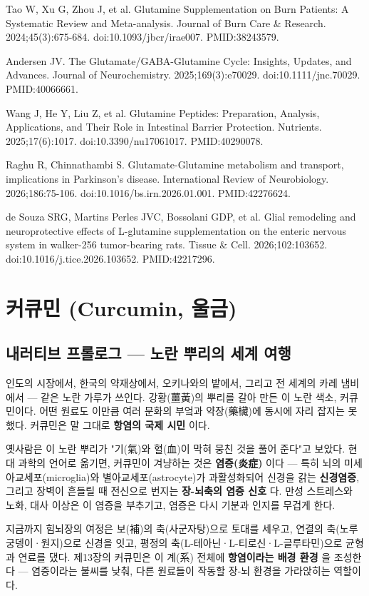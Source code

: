 \documentclass[11pt,oneside]{book}
\newcommand{\refend}{\endgroup\par}
\newcommand{\reff}[2]{\par\hangindent=7mm\hangafter=1\noindent[#1]\hspace{2mm}#2\par}
\begin{document}
\reff{34}{Tao W, Xu G, Zhou J, et al. Glutamine Supplementation on Burn Patients: A Systematic Review and Meta-analysis. Journal of Burn Care \& Research. 2024;45(3):675-684. doi:10.1093/jbcr/irae007. PMID:38243579.}
\reff{35}{Andersen JV. The Glutamate/GABA-Glutamine Cycle: Insights, Updates, and Advances. Journal of Neurochemistry. 2025;169(3):e70029. doi:10.1111/jnc.70029. PMID:40066661.}
\reff{36}{Wang J, He Y, Liu Z, et al. Glutamine Peptides: Preparation, Analysis, Applications, and Their Role in Intestinal Barrier Protection. Nutrients. 2025;17(6):1017. doi:10.3390/nu17061017. PMID:40290078.}
\reff{37}{Raghu R, Chinnathambi S. Glutamate-Glutamine metabolism and transport, implications in Parkinson's disease. International Review of Neurobiology. 2026;186:75-106. doi:10.1016/bs.irn.2026.01.001. PMID:42276624.}
\reff{38}{de Souza SRG, Martins Perles JVC, Bossolani GDP, et al. Glial remodeling and neuroprotective effects of L-glutamine supplementation on the enteric nervous system in walker-256 tumor-bearing rats. Tissue \& Cell. 2026;102:103652. doi:10.1016/j.tice.2026.103652. PMID:42217296.}
\refend


\chapter{커큐민 (Curcumin, 울금)}

\section{내러티브 프롤로그 — 노란 뿌리의 세계 여행}
인도의 시장에서, 한국의 약재상에서, 오키나와의 밭에서, 그리고 전 세계의 카레 냄비에서 — 같은 노란 가루가 쓰인다. 강황(薑黃)의 뿌리를 갈아 만든 이 노란 색소, 커큐민이다. 어떤 원료도 이만큼 여러 문화의 부엌과 약장(藥欌)에 동시에 자리 잡지는 못했다. 커큐민은 말 그대로 \textbf{항염의 국제 시민} 이다.

옛사람은 이 노란 뿌리가 "기(氣)와 혈(血)이 막혀 뭉친 것을 풀어 준다"고 보았다. 현대 과학의 언어로 옮기면, 커큐민이 겨냥하는 것은 \textbf{염증(炎症)} 이다 — 특히 뇌의 미세아교세포(microglia)와 별아교세포(astrocyte)가 과활성화되어 신경을 갉는 \textbf{신경염증}, 그리고 장벽이 흔들릴 때 전신으로 번지는 \textbf{장-뇌축의 염증 신호} 다. 만성 스트레스와 노화, 대사 이상은 이 염증을 부추기고, 염증은 다시 기분과 인지를 무겁게 한다.

지금까지 힘뇌장의 여정은 보(補)의 축(사군자탕)으로 토대를 세우고, 연결의 축(노루궁뎅이·원지)으로 신경을 잇고, 평정의 축(L-테아닌·L-티로신·L-글루타민)으로 균형과 연료를 댔다. 제13장의 커큐민은 이 계(系) 전체에 \textbf{항염이라는 배경 환경} 을 조성한다 — 염증이라는 불씨를 낮춰, 다른 원료들이 작동할 장-뇌 환경을 가라앉히는 역할이다.
\end{document}
